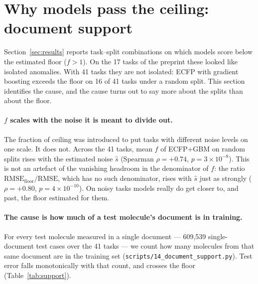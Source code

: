 \section{Why models pass the ceiling: document support}\label{sec:support}

Section~\ref{sec:results} reports task--split combinations on which models score below the estimated floor ($f>1$). On the 17 tasks of the preprint these looked like isolated anomalies. With 41 tasks they are not isolated: ECFP with gradient boosting exceeds the floor on 16 of 41 tasks under a random split. This section identifies the cause, and the cause turns out to say more about the splits than about the floor.

\paragraph{$f$ scales with the noise it is meant to divide out.} The fraction of ceiling was introduced to put tasks with different noise levels on one scale. It does not. Across the 41 tasks, mean $f$ of ECFP+GBM on random splits rises with the estimated noise $\hat s$ (Spearman $\rho=+0.74$, $p=3\times10^{-8}$). This is not an artefact of the vanishing headroom in the denominator of $f$: the ratio $\mathrm{RMSE}_{\mathrm{floor}}/\mathrm{RMSE}$, which has no such denominator, rises with $\hat s$ just as strongly ($\rho=+0.80$, $p=4\times10^{-10}$). On noisy tasks models really do get closer to, and past, the floor estimated for them.

\paragraph{The cause is how much of a test molecule's document is in training.} For every test molecule measured in a single document --- 609{,}539 single-document test cases over the 41 tasks --- we count how many molecules from that same document are in the training set (\texttt{scripts/}\allowbreak\texttt{14\_document\_support.py}). Test error falls monotonically with that count, and crosses the floor (Table~\ref{tab:support}).

